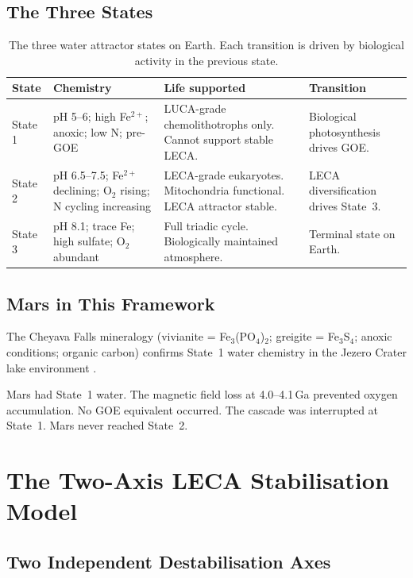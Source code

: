 \documentclass[11pt, a4paper]{article}
\begin{document}
\subsection{The Three States}

\begin{table}[h]
\centering
\small
\begin{tabularx}{\linewidth}{p{1.2cm}p{3.0cm}p{3.0cm}X}
\toprule
\textbf{State} & \textbf{Chemistry} &
\textbf{Life supported} & \textbf{Transition} \\
\midrule
State 1 &
pH 5--6; high Fe$^{2+}$; anoxic;
low N; pre-GOE &
LUCA-grade chemolithotrophs only.
Cannot support stable LECA. &
Biological photosynthesis
drives GOE. \\[0.3em]
State 2 &
pH 6.5--7.5; Fe$^{2+}$ declining;
O$_2$ rising; N cycling increasing &
LECA-grade eukaryotes.
Mitochondria functional.
LECA attractor stable. &
LECA diversification drives
State~3. \\[0.3em]
State 3 &
pH 8.1; trace Fe; high sulfate;
O$_2$ abundant &
Full triadic cycle.
Biologically maintained atmosphere. &
Terminal state on Earth. \\
\bottomrule
\end{tabularx}
\caption{The three water attractor states on Earth.
  Each transition is driven by biological activity
  in the previous state.}
\end{table}

\subsection{Mars in This Framework}

The Cheyava Falls mineralogy (vivianite =
Fe$_3$(PO$_4$)$_2$; greigite = Fe$_3$S$_4$;
anoxic conditions; organic carbon) confirms
State~1 water chemistry in the Jezero Crater
lake environment \cite{hurowitz2025}.

Mars had State~1 water.
The magnetic field loss at 4.0--4.1\,Ga
prevented oxygen accumulation.
No GOE equivalent occurred.
The cascade was interrupted at State~1.
Mars never reached State~2.

\section{The Two-Axis LECA Stabilisation Model}

\subsection{Two Independent Destabilisation Axes}
\end{document}
